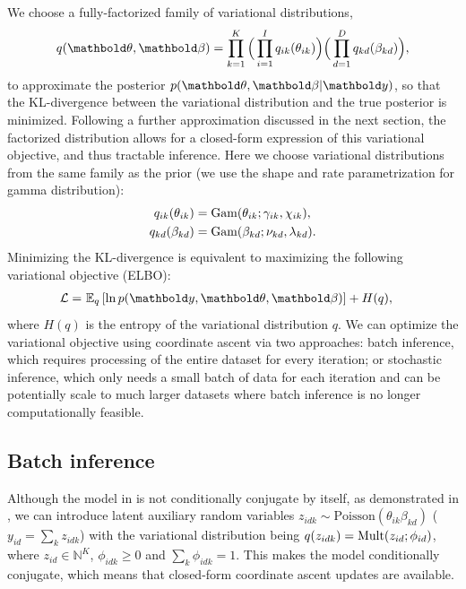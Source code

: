 We choose a fully-factorized family of variational distributions,
\begin{equation*}
q(\mb{\theta}, \mb{\beta}) = \prod_{k=1}^K \Big(\prod_{i=1}^I q_{ik}(\theta_{ik})\Big) \Big(\prod_{d=1}^D q_{kd}(\beta_{kd})\Big),
\end{equation*}
to approximate the posterior $p(\mb{\theta}, \mb{\beta} | \mb{y})$, so that the
\gls{KL}-divergence between the variational distribution and
the true posterior is minimized. Following a further approximation discussed in the next section, the factorized distribution allows for a closed-form expression of this variational objective, and thus tractable inference. Here we choose variational distributions from the same family as the prior (we use the shape and rate parametrization for gamma distribution):
\begin{equation*}
\begin{split}
q_{ik}(\theta_{ik}) &= \mathrm{Gam}(\theta_{ik}; \gamma_{ik}, \chi_{ik}),\\
q_{kd}(\beta_{kd}) &= \mathrm{Gam}(\beta_{kd}; \nu_{kd},  \lambda_{kd}).
\end{split}
\end{equation*}
Minimizing the \gls{KL}-divergence is equivalent to maximizing the following variational objective (\gls{ELBO}):
\begin{align*}\label{eq:vlb}
\mathcal{L} =~& \EE{q}{\ln p(\mb{y}, \mb{\theta}, \mb{\beta})} + H(q),
\end{align*}
where $H(q)$ is the entropy of the variational distribution $q$.
We can optimize the variational objective using coordinate ascent via two approaches: batch inference, which requires processing of the entire dataset for every iteration; or stochastic inference, which only needs a small batch of data for each iteration and can be potentially scale to much larger datasets where batch inference is no longer computationally feasible.

\subsection{Batch inference} \label{chpt:tagging:sec:batch_vi}
Although the model in  is not conditionally conjugate by itself, as demonstrated in \citet{cemgil2009bayesian}, we can introduce latent auxiliary random variables $z_{idk} \sim \text{Poisson}( \theta_{ik} \beta_{kd})$ ($y_{id} = \sum_k z_{idk}$)
with the variational distribution being $q(z_{idk}) = \mathrm{Mult}(z_{id}; \phi_{id})$, where $z_{id} \in \mathbb{N}^K$, $\phi_{idk} \geq 0$ and $\sum_k \phi_{idk} = 1$.
This makes the model conditionally conjugate, which means that closed-form coordinate ascent updates are available. 

